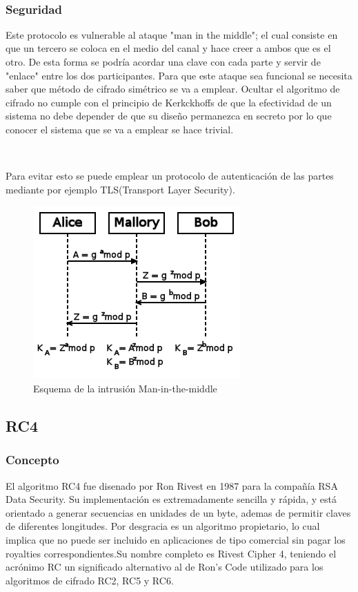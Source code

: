 \documentclass[11pt, conference]{IEEEtran}
\begin{document}
\

\subsubsection{Seguridad}
Este protocolo es vulnerable al ataque "man in the middle"; el cual consiste en que un tercero se coloca en el medio del canal y hace creer a ambos que es el otro. De esta forma se podría acordar una clave con cada parte y servir de "enlace" entre los dos participantes. Para que este ataque sea funcional se necesita saber que método de cifrado simétrico se va a emplear. Ocultar el algoritmo de cifrado no cumple con el principio de Kerkckhoffs de que la efectividad de un sistema no debe depender de que su diseño permanezca en secreto por lo que conocer el sistema que se va a emplear se hace trivial.

\

Para evitar esto se puede emplear un protocolo de autenticación de las partes mediante por ejemplo TLS(Transport Layer Security).

\begin{figure}[h]
	\begin{center}
		\includegraphics[scale=0.60]{man.png} \end{center}
	\caption{Esquema de la intrusión Man-in-the-middle}
\end{figure}



\subsection{\bf RC4}
\subsubsection{Concepto}
El algoritmo RC4 fue disenado por Ron Rivest en 1987 para la compañía RSA Data Security. Su implementación es extremadamente sencilla y rápida, y está orientado a  generar secuencias en unidades de un byte, ademas de permitir claves de diferentes  longitudes. Por desgracia es un algoritmo propietario, lo cual implica que no puede ser incluido en aplicaciones de tipo comercial sin pagar los royalties correspondientes.Su nombre completo es Rivest Cipher 4, teniendo el acrónimo RC un significado alternativo al de Ron's Code utilizado para los algoritmos de cifrado RC2, RC5 y RC6.
\end{document}
